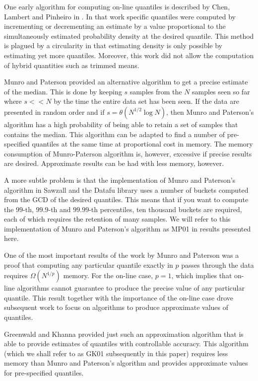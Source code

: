 \documentclass[11pt]{amsart}
\begin{document}
One early algorithm for computing on-line quantiles is described by Chen, Lambert and Pinheiro in \cite{Chen2000}.  In that work specific quantiles were computed by incrementing or decrementing an estimate by a value proportional to the simultaneously estimated probability density at the desired quantile.  This method is plagued by a circularity in that estimating density is only possible by estimating yet more quantiles.  Moreover, this work did not allow the computation of hybrid quantities such as trimmed means.

Munro and Paterson\cite{munro1980} provided an alternative algorithm to get a precise estimate of the median.  This is done by keeping $s$ samples from the $N$ samples seen so far where $s << N$ by the time the entire data set has been seen.  If the data are presented in random order and if $s = \theta(N^{1/2} \log N)$, then Munro and Paterson's algorithm has a high probability of being able to retain a set of samples that contains the median.  This algorithm can be adapted to find a number of pre-specified quantiles at the same time at proportional cost in memory.  The memory consumption of Munro-Paterson algorithm is, however, excessive if precise results are desired.  Approximate results can be had with less memory, however.  

A more subtle problem is that the implementation of Munro and Paterson's algorithm in Sawzall\cite{sawzall} and the Datafu library\cite{datafu} uses a number of buckets computed from the GCD of the desired quantiles.  This means that if you want to compute the $99$-th, $99.9$-th and $99.99$-th percentiles, ten thousand buckets are required, each of which requires the retention of many samples. We will refer to this implementation of Munro and Paterson's algorithm as MP01 in results presented here.

One of the most important results of the work by Munro and Paterson was a proof that computing any particular quantile exactly in $p$ passes through the data requires $\Omega(N^{1/p})$ memory. For the on-line case, $p=1$, which implies that on-line algorithms cannot guarantee to produce the precise value of any particular quantile. This result together with the importance of the on-line case drove subsequent work to focus on algorithms to produce approximate values of quantiles.

Greenwald and Khanna\cite{Greenwald-space-efficient-online-quantiles} provided just such an approximation algorithm that is able to provide estimates of quantiles with controllable accuracy. This algorithm (which we shall refer to as GK01 subsequently in this paper) requires less memory than Munro and Paterson's algorithm and provides approximate values for pre-specified quantiles.
\end{document}
